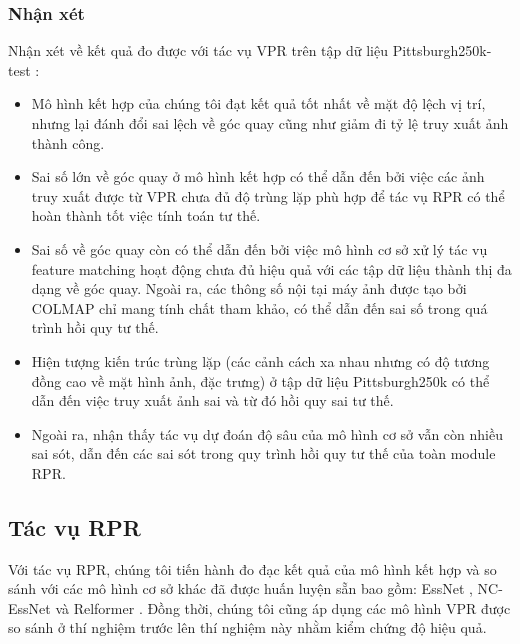 \subsubsection*{Nhận xét}
Nhận xét về kết quả đo được với tác vụ VPR trên tập dữ liệu Pittsburgh250k-test \cite{6618963}:
\begin{itemize}
	\item Mô hình kết hợp của chúng tôi đạt kết quả tốt nhất về mặt độ lệch vị trí, nhưng lại đánh đổi sai lệch về góc quay cũng như giảm đi tỷ lệ truy xuất ảnh thành công.
	\item Sai số lớn về góc quay ở mô hình kết hợp có thể dẫn đến bởi việc các ảnh truy xuất được từ VPR chưa đủ độ trùng lặp phù hợp để tác vụ RPR có thể hoàn thành tốt việc tính toán tư thế.
	\item Sai số về góc quay còn có thể dẫn đến bởi việc mô hình cơ sở xử lý tác vụ feature matching hoạt động chưa đủ hiệu quả với các tập dữ liệu thành thị đa dạng về góc quay. Ngoài ra, các thông số nội tại máy ảnh được tạo bởi COLMAP chỉ mang tính chất tham khảo, có thể dẫn đến sai số trong quá trình hồi quy tư thế.
	\item Hiện tượng kiến trúc trùng lặp (các cảnh cách xa nhau nhưng có độ tương đồng cao về mặt hình ảnh, đặc trưng) ở tập dữ liệu Pittsburgh250k \cite{6618963} có thể dẫn đến việc truy xuất ảnh sai và từ đó hồi quy sai tư thế.
	\item Ngoài ra, nhận thấy tác vụ dự đoán độ sâu của mô hình cơ sở vẫn còn nhiều sai sót, dẫn đến các sai sót trong quy trình hồi quy tư thế của toàn module RPR.
\end{itemize}

\subsection*{Tác vụ RPR}

Với tác vụ RPR, chúng tôi tiến hành đo đạc kết quả của mô hình kết hợp và so sánh với các mô hình cơ sở khác đã được huấn luyện sẵn bao gồm: EssNet \cite{zhou2020learn}, NC-EssNet \cite{zhou2020learn} và Relformer \cite{idan2023learning}. Đồng thời, chúng tôi cũng áp dụng các mô hình VPR được so sánh ở thí nghiệm trước lên thí nghiệm này nhằm kiểm chứng độ hiệu quả. 

